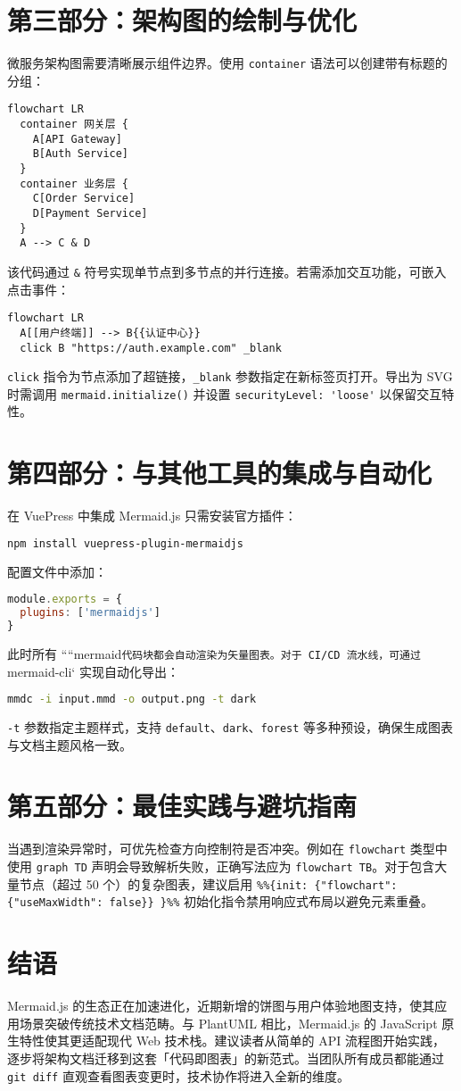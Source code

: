 \chapter{第三部分：架构图的绘制与优化}
微服务架构图需要清晰展示组件边界。使用 \verb!container! 语法可以创建带有标题的分组：\par
\begin{lstlisting}[language=mermaid]
flowchart LR
  container 网关层 {
    A[API Gateway]
    B[Auth Service]
  }
  container 业务层 {
    C[Order Service]
    D[Payment Service]
  }
  A --> C & D
\end{lstlisting}
该代码通过 \verb!&! 符号实现单节点到多节点的并行连接。若需添加交互功能，可嵌入点击事件：\par
\begin{lstlisting}[language=mermaid]
flowchart LR
  A[[用户终端]] --> B{{认证中心}}
  click B "https://auth.example.com" _blank
\end{lstlisting}
\verb!click! 指令为节点添加了超链接，\verb!_blank! 参数指定在新标签页打开。导出为 SVG 时需调用 \verb!mermaid.initialize()! 并设置 \verb!securityLevel: 'loose'! 以保留交互特性。\par
\chapter{第四部分：与其他工具的集成与自动化}
在 VuePress 中集成 Mermaid.js 只需安装官方插件：\par
\begin{lstlisting}[language=bash]
npm install vuepress-plugin-mermaidjs
\end{lstlisting}
配置文件中添加：\par
\begin{lstlisting}[language=javascript]
module.exports = {
  plugins: ['mermaidjs']
}
\end{lstlisting}
此时所有 ````mermaid\verb!代码块都会自动渲染为矢量图表。对于 CI/CD 流水线，可通过!mermaid-cli` 实现自动化导出：\par
\begin{lstlisting}[language=bash]
mmdc -i input.mmd -o output.png -t dark
\end{lstlisting}
\verb!-t! 参数指定主题样式，支持 \verb!default!、\verb!dark!、\verb!forest! 等多种预设，确保生成图表与文档主题风格一致。\par
\chapter{第五部分：最佳实践与避坑指南}
当遇到渲染异常时，可优先检查方向控制符是否冲突。例如在 \verb!flowchart! 类型中使用 \verb!graph TD! 声明会导致解析失败，正确写法应为 \verb!flowchart TB!。对于包含大量节点（超过 50 个）的复杂图表，建议启用 \verb!%%{init: {"flowchart": {"useMaxWidth": false}} }%%! 初始化指令禁用响应式布局以避免元素重叠。\par
\chapter{结语}
Mermaid.js 的生态正在加速进化，近期新增的饼图与用户体验地图支持，使其应用场景突破传统技术文档范畴。与 PlantUML 相比，Mermaid.js 的 JavaScript 原生特性使其更适配现代 Web 技术栈。建议读者从简单的 API 流程图开始实践，逐步将架构文档迁移到这套「代码即图表」的新范式。当团队所有成员都能通过 \verb!git diff! 直观查看图表变更时，技术协作将进入全新的维度。\par
